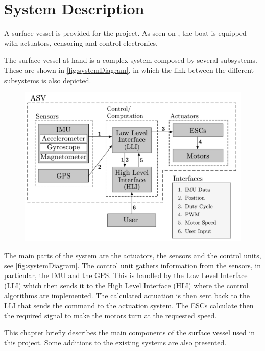 \chapter{System Description}
A surface vessel is provided for the project. As seen on , the boat is equipped with actuators, censoring and control electronics.

The surface vessel at hand is a complex system composed by several subsystems. These are shown in \autoref{fig:systemDiagram}, in which the link between the different subsystems is also depicted.
\begin{figure}[H]
    \includegraphics[width=.65\textwidth]{figures/systemDiagram3}
    \caption{}
    \label{fig:systemDiagram}
\end{figure}
The main parts of the system are the actuators, the sensors and the control units, see \autoref{fig:systemDiagram}. The control unit gathers information from the sensors, in particular, the IMU and the GPS. This is handled by the Low Level Interface (LLI) which then sends it to the High Level Interface (HLI) where the control algorithms are implemented. The calculated actuation is then sent back to the LLI that sends the command to the actuation system. The ESCs calculate then the required signal to make the motors turn at the requested speed. 

This chapter briefly describes the main components of the surface vessel used in this project. Some additions to the existing systems are also presented. \cite{aauship}

